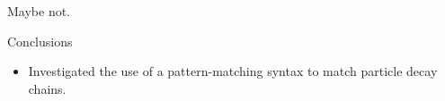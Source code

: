 \documentclass[aspectratio=169]{beamer}
\begin{document}
\begin{frame}{}
\Large
\vspace{1.25 cm}
\begin{center}
Maybe not.
\end{center}
\end{frame}

\begin{frame}{Conclusions}
\Large
\vspace{0.5 cm}
\begin{itemize}
\item Investigated the use of a pattern-matching syntax to match particle decay chains.
\end{itemize}
\end{frame}
\end{document}
